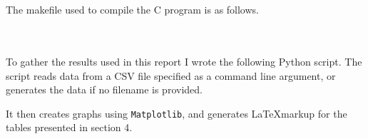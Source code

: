 \documentclass{article}
\begin{document}
\begin{appendices}

\section{}
The makefile used to compile the C program is as follows.

\inputminted{make}{alg-cw1/Makefile}

\section{}
To gather the results used in this report I wrote the following Python script. The script reads data from a CSV file specified as a command line argument, or generates the data if no filename is provided.

It then creates graphs using \texttt{Matplotlib}, and generates \LaTeX markup for the tables presented in section 4.

\inputminted{python}{alg-cw1/get_results.py}

\end{appendices}
\end{document}

